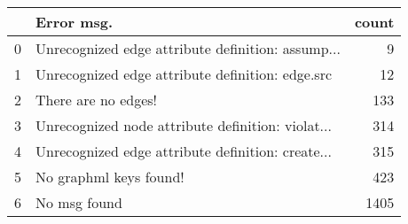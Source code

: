\documentclass[notitlepage]{article}
\begin{document}
\begin{tabular}{llr}
\toprule
{} &                                         Error msg. &  count \\
\midrule
0 &  Unrecognized edge attribute definition: assump... &      9 \\
1 &   Unrecognized edge attribute definition: edge.src &     12 \\
2 &                                There are no edges! &    133 \\
3 &  Unrecognized node attribute definition: violat... &    314 \\
4 &  Unrecognized edge attribute definition: create... &    315 \\
5 &                             No graphml keys found! &    423 \\
6 &                                       No msg found &   1405 \\
\bottomrule
\end{tabular}
\end{document}

